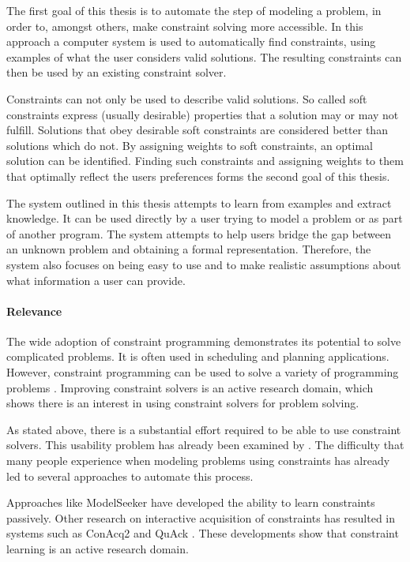 The first goal of this thesis is to automate the step of modeling a problem, in order to, amongst others, make constraint solving more accessible. In this approach a computer system is used to automatically find constraints, using examples of what the user considers valid solutions. The resulting constraints can then be used by an existing constraint solver.

Constraints can not only be used to describe valid solutions. So called soft constraints express (usually desirable) properties that a solution may or may not fulfill. Solutions that obey desirable soft constraints are considered better than solutions which do not. By assigning weights to soft constraints, an optimal solution can be identified. Finding such constraints and assigning weights to them that optimally reflect the users preferences forms the second goal of this thesis. 

The system outlined in this thesis attempts to learn from examples and extract knowledge. It can be used directly by a user trying to model a problem or as part of another program. The system attempts to help users bridge the gap between an unknown problem and obtaining a formal representation. Therefore, the system also focuses on being easy to use and to make realistic assumptions about what information a user can provide.

\paragraph{Relevance}
The wide adoption of constraint programming demonstrates its potential to solve complicated problems. It is often used in scheduling and planning applications. However, constraint programming can be used to solve a variety of programming problems \cite{Dymchenki:GoogleCodeJamEclipse}. Improving constraint solvers is an active research domain, which shows there is an interest in using constraint solvers for problem solving.

As stated above, there is a substantial effort required to be able to use constraint solvers. This usability problem has already been examined by \cite{Wallace:PrinciplesCP}. The difficulty that many people experience when modeling problems using constraints has already led to several approaches to automate this process.

Approaches like  ModelSeeker \cite{Beldiceanu:ModelSeeker} have developed the ability to learn constraints passively.
Other research on interactive acquisition of constraints has resulted in systems such as ConAcq2 \cite{bessiere2007query} and QuAck \cite{bessiere2007query}.
These developments show that constraint learning is an active research domain.

